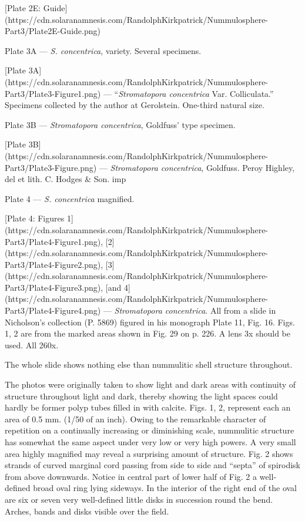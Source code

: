 \documentclass[a4paper, 12pt, oneside]{article}
\begin{document}
[Plate 2E: Guide](https://cdn.solaranamnesis.com/RandolphKirkpatrick/Nummulosphere-Part3/Plate2E-Guide.png)

Plate 3A --- \emph{S. concentrica}, variety. Several specimens.

[Plate 3A](https://cdn.solaranamnesis.com/RandolphKirkpatrick/Nummulosphere-Part3/Plate3-Figure1.png) --- ``\emph{Stromatopora concentrica} Var. Colliculata.'' Specimens collected by the author at Gerolstein. One-third natural size.

Plate 3B --- \emph{Stromatopora concentrica}, Goldfuss' type specimen.

[Plate 3B](https://cdn.solaranamnesis.com/RandolphKirkpatrick/Nummulosphere-Part3/Plate3-Figure.png) --- \emph{Stromatopora concentrica}, Goldfuss. Peroy Highley, del et lith. C. Hodges \& Son. imp

Plate 4 --- \emph{S. concentrica} magnified.

[Plate 4: Figures 1](https://cdn.solaranamnesis.com/RandolphKirkpatrick/Nummulosphere-Part3/Plate4-Figure1.png), [2](https://cdn.solaranamnesis.com/RandolphKirkpatrick/Nummulosphere-Part3/Plate4-Figure2.png), [3](https://cdn.solaranamnesis.com/RandolphKirkpatrick/Nummulosphere-Part3/Plate4-Figure3.png), [and 4](https://cdn.solaranamnesis.com/RandolphKirkpatrick/Nummulosphere-Part3/Plate4-Figure4.png) --- \emph{Stromatopora concentrica}. All from a slide in Nicholson's collection (P. 5869) figured in his monograph Plate 11, Fig. 16. Figs. 1, 2 are from the marked areas shown in Fig. 29 on p. 226. A lens 3x should be used. All 260x.

The whole slide shows nothing else than nummulitic shell structure throughout.

The photos were originally taken to show light and dark areas with continuity of structure throughout light and dark, thereby showing the light spaces could hardly be former polyp tubes filled in with calcite. Figs. 1, 2, represent each an area of 0.5 mm. (1/50 of an inch). Owing to the remarkable character of repetition on a continually increasing or diminishing scale, nummulitic structure has somewhat the same aspect under very low or very high powers. A very small area highly magnified may reveal a surprising amount of structure. Fig. 2 shows strands of curved marginal cord passing from side to side and ``septa'' of spirodisk from above downwards. Notice in central part of lower half of Fig. 2 a well-defined broad oval ring lying sideways. In the interior of the right end of the oval are six or seven very well-defined little disks in succession round the bend. Arches, bands and disks visible over the field.
\end{document}
